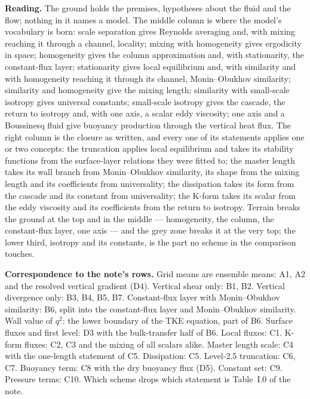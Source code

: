 \documentclass[10pt]{article}
\newcommand{\qsq}{q^{2}}
\begin{document}
\vspace{0.1ex}
{\footnotesize\textbf{Reading.} The ground holds the premises, hypotheses about the fluid and the flow; nothing in it names a model. The middle column is where
the model's vocabulary is born: scale separation gives Reynolds averaging and, with mixing reaching it through a channel, locality; mixing with homogeneity gives ergodicity in space; homogeneity gives the
column approximation and, with stationarity, the constant-flux layer; stationarity gives local equilibrium and, with similarity and with homogeneity reaching it through its channel, Monin--Obukhov similarity; similarity and homogeneity give the mixing length; similarity with small-scale isotropy gives universal constants; small-scale isotropy gives the cascade, the return to isotropy and, with one axis, a scalar
eddy viscosity; one axis and a Boussinesq fluid give buoyancy production through the vertical heat flux. The right
column is the closure as written, and every one of its statements applies one or two concepts: the truncation
applies local equilibrium and takes its stability functions from the surface-layer relations they were fitted
to; the master length takes its wall branch from Monin--Obukhov similarity, its shape from the mixing length and its coefficients from universality;
the dissipation takes its form from the cascade and its constant from universality; the K-form takes its scalar
from the eddy viscosity and its coefficients from the return to isotropy. Terrain breaks the ground at the top
and in the middle --- homogeneity, the column, the constant-flux layer, one axis --- and the grey zone breaks it
at the very top; the lower third, isotropy and its constants, is the part no scheme in the comparison touches.\par}

\vspace{0.1ex}
{\footnotesize\textbf{Correspondence to the note's rows.} Grid means are ensemble means: A1, A2 and the resolved vertical gradient (D4). Vertical shear only: B1, B2. Vertical divergence only: B3, B4, B5, B7. Constant-flux layer with Monin--Obukhov similarity:
B6, split into the constant-flux layer and Monin--Obukhov similarity. Wall value of $\qsq$: the lower boundary of the TKE equation, part of B6. Surface fluxes and first level: D3 with the bulk-transfer half of B6. Local fluxes: C1. K-form fluxes: C2, C3 and the mixing of all scalars alike. Master length scale: C4 with the one-length statement of C5. Dissipation: C5. Level-2.5
truncation: C6, C7. Buoyancy term: C8 with the dry buoyancy flux (D5). Constant set: C9. Pressure terms: C10.
Which scheme drops which statement is Table~I.0 of the note.\par}
\end{document}
